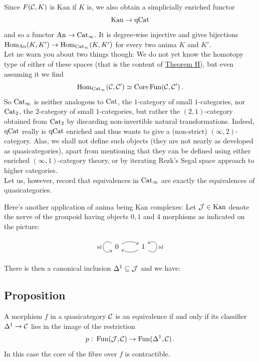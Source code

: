         Since $F(\mathcal{C}, K)$ is Kan if $K$ is, we also obtain a simplicially enriched functor
        \begin{equation*}
            \operatorname{Kan} \to \mathrm{qCat}
        \end{equation*}
        and so a functor $\operatorname{An} \to \operatorname{Cat}_{\infty}$. It is degree-wise injective and gives bijections $\operatorname{Hom}_{\operatorname{An}}(K, K') \to \operatorname{Hom}_{\operatorname{Cat}_{\infty}}(K, K')$ for every two anima $K$ and $K'$.\\
        Let ne warn you about two things though: We do not yet know the homotopy type of either of these spaces (that is the content of \hyperref[chIV-thm-h]{Theorem H}), but even assuming it we find
        \begin{equation*}
            \operatorname{Hom}_{\operatorname{Cat}_{\infty}}(\mathcal{C}, \mathcal{C}') \simeq \operatorname{Core} \operatorname{Fun}(\mathcal{C}, \mathcal{C}') \,.
        \end{equation*}
        So $\operatorname{Cat}_{\infty}$ is neither analogous to $\operatorname{Cat}$, the $1$-category of small $1$-categories, nor $\operatorname{Cat}_2$, the $2$-category of small $1$-categories, but rather the $(2, 1)$-category obtained from $\operatorname{Cat}_2$ by discarding non-invertible natural transformations. Indeed, $\mathrm{qCat}$ really is $\mathrm{qCat}$ enriched and thus wants to give a (non-strict) $(\infty, 2)$-category. Alas, we shall not define such objects (they are not nearly as developed as quasicategories), apart from mentioning that they can be defined using either enriched $(\infty, 1)$-category theory, or by iterating Rezk's Segal space approach to higher categories.\\
        Let us, however, record that equivalences in $\operatorname{Cat}_{\infty}$ are exactly the equivalences of quasicategories.
        \medskip

        Here's another application of anima being Kan complexes: Let $\mathcal{J} \in \operatorname{Kan}$ denote the nerve of the groupoid having objects $0, 1$ and 4 morphisms as indicated on the picture:
        \begin{equation*}
            \begin{tikzcd}
                0 \arrow[loop, distance=2em, in=215, out=145, "\id"'] \arrow[r, bend left] & 1 \arrow[loop, distance=2em, in=35, out=325, "\id"'] \arrow[l, bend left]
            \end{tikzcd}
        \end{equation*}
        There is then a canonical inclusion $\Delta^1 \subseteq \mathcal{J}$ and we have:

    \subsection{Proposition}\label{chVI-3-24}
        A morphism $f$ in a quasicategory $\mathcal{C}$ is an equivalence if and only if its classifier $\Delta^1 \to \mathcal{C}$ lies in the image of the restriction
        \begin{equation*}
            p \,\colon \operatorname{Fun}(\mathcal{J}, \mathcal{C}) \to \operatorname{Fun}(\Delta^1, \mathcal{C}) \,.
        \end{equation*}
        In this case the core of the fibre over $f$ is contractible.
        \medskip

